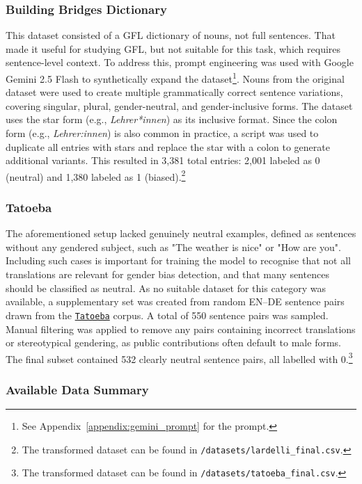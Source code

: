 \subsubsection{Building Bridges Dictionary} 
This dataset consisted of a GFL dictionary of nouns, not full sentences. That made it useful for studying GFL, but not suitable for this task, which requires sentence-level context. To address this, prompt engineering was used with Google Gemini 2.5 Flash to synthetically expand the dataset\footnote{See Appendix~\ref{appendix:gemini_prompt} for the prompt.}. Nouns from the original dataset were used to create multiple grammatically correct sentence variations, covering singular, plural, gender-neutral, and gender-inclusive forms. The dataset uses the star form (e.g., \textit{Lehrer*innen}) as its inclusive format. Since the colon form (e.g., \textit{Lehrer:innen}) is also common in practice, a script was used to duplicate all entries with stars and replace the star with a colon to generate additional variants. This resulted in 3,381 total entries: 2,001 labeled as 0 (neutral) and 1,380 labeled as 1 (biased).\footnote{The transformed dataset can be found in \texttt{/datasets/lardelli\_final.csv}.}

\subsubsection{Tatoeba} 

The aforementioned setup lacked genuinely neutral examples, defined as sentences without any gendered subject, such as "The weather is nice" or "How are you". Including such cases is important for training the model to recognise that not all translations are relevant for gender bias detection, and that many sentences should be classified as neutral. As no suitable dataset for this category was available, a supplementary set was created from random EN–DE sentence pairs drawn from the \texttt{\href{https://tatoeba.org/en/}{Tatoeba}} corpus. A total of 550 sentence pairs was sampled. Manual filtering was applied to remove any pairs containing incorrect translations or stereotypical gendering, as public contributions often default to male forms. The final subset contained 532 clearly neutral sentence pairs, all labelled with 0.\footnote{The transformed dataset can be found in \texttt{/datasets/tatoeba\_final.csv}.}


\subsubsection{Available Data Summary}

